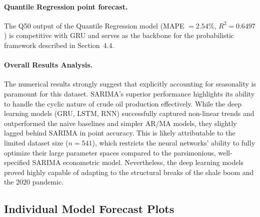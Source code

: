 \documentclass[12pt,a4paper]{article}
\begin{document}
\paragraph{Quantile Regression point forecast.}
The Q50 output of the Quantile Regression model (MAPE $= 2.54\%$, $R^2 = 0.6497$) is competitive with GRU and serves as the backbone for the probabilistic framework described in Section~4.4.

\paragraph{Overall Results Analysis.}
The numerical results strongly suggest that explicitly accounting for seasonality is paramount for this dataset. SARIMA's superior performance highlights its ability to handle the cyclic nature of crude oil production effectively. While the deep learning models (GRU, LSTM, RNN) successfully captured non-linear trends and outperformed the naive baselines and simpler AR/MA models, they slightly lagged behind SARIMA in point accuracy. This is likely attributable to the limited dataset size ($n=541$), which restricts the neural networks' ability to fully optimize their large parameter spaces compared to the parsimonious, well-specified SARIMA econometric model. Nevertheless, the deep learning models proved highly capable of adapting to the structural breaks of the shale boom and the 2020 pandemic.

\subsection{Individual Model Forecast Plots}
\end{document}
